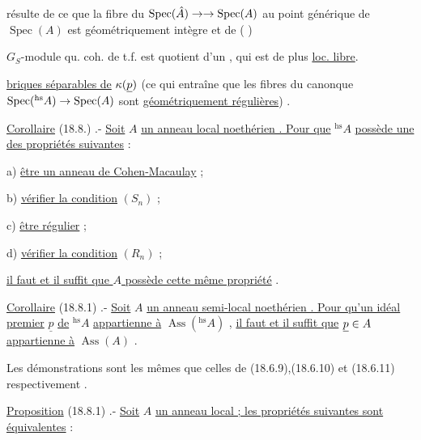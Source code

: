    résulte de ce que la fibre du  $\operatorname{Spec}(\hat A)\to\to\operatorname{Spec}(A)$ au point générique de $\operatorname{Spec}(A)$ est géométriquement  intègre et de ( ) 

$G_S$-module  qu. coh. de t.f. est quotient d'un , qui est de plus \uline{loc. libre}.

\uline{briques séparables de} $\kappa(\underline p)$ (ce qui entraîne que les fibres du  canonque $\operatorname{Spec}({}^{\mathrm{hs}}A)\to\operatorname{Spec}(A)$ sont \uline{géométriquement régulières}) .

\uline{Corollaire} (18.8.) .- \uline{Soit} $A$ \uline{un anneau local noethérien . Pour que} $ {}^{\mathrm{hs}}A$ \uline{possède une des propriétés suivantes}\deleted{\unsure{,}} :

a) \uline{être un anneau de Cohen-Macaulay} ;

b) \uline{vérifier la condition} $(S_n)$ ;

c) \uline{être régulier} ;

d) \uline{vérifier la condition} $(R_n)$ ; 

\uline{il faut et il suffit que $A$ possède cette même propriété} .

\uline{Corollaire} (18.8.1) .- \uline{Soit} $A$ \uline{un anneau semi-local noethérien . Pour qu'un idéal premier} $\underline p$ \uline{de} $ {}^{\mathrm{hs}}A$ \uline{appartienne à} $\operatorname{Ass}({}^{\mathrm{hs}}A)$ , \uline{il faut et il suffit que} $\underline p\in A$ \uline{appartienne à} $\operatorname{Ass}(A)$ .

Les démonstrations sont les mêmes que celles de (18.6.9),(18.6.10) et (18.6.11) respectivement .

\uline{Proposition} (18.8.1) .- \uline{Soit} $A$ \uline{un anneau local ; les propriétés suivantes sont équivalentes} :

